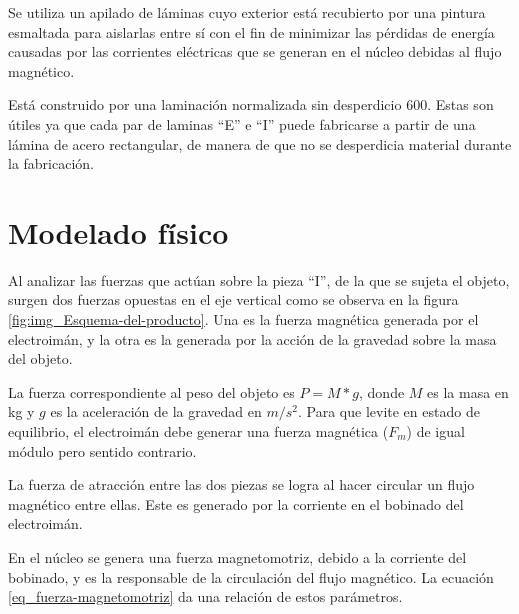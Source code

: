 \noindent Se utiliza un apilado de láminas cuyo exterior está recubierto por una pintura esmaltada para aislarlas entre sí con el fin de minimizar las pérdidas de energía causadas por las corrientes eléctricas que se generan en el núcleo debidas al flujo magnético. 

\noindent Está construido por una laminación normalizada sin desperdicio 600. Estas son útiles ya que cada par de laminas ``E'' e ``I'' puede fabricarse a partir de una lámina de acero rectangular, de manera de que no se desperdicia material durante la fabricación. 



\section{Modelado físico}

\noindent Al analizar las fuerzas que actúan sobre la pieza ``I'', de la que se sujeta el objeto, surgen dos fuerzas opuestas en el eje vertical como se observa en la figura \ref{fig:img_Esquema-del-producto}. Una es la fuerza magnética generada por el electroimán, y la otra es la generada por la acción de la gravedad sobre la masa del objeto. 
 

\noindent La fuerza correspondiente al peso del objeto es $P=M*g$, donde $M$ es la masa en kg y $g$ es la aceleración de la gravedad en $m/s^2$. Para que levite en estado de equilibrio, el electroimán debe generar una fuerza magnética ($F_{m}$) de igual módulo pero sentido contrario.

\noindent La fuerza de atracción entre las dos piezas se logra al hacer circular un flujo magnético entre ellas. Este es generado por la corriente en el bobinado del electroimán.

\noindent En el núcleo se genera una fuerza magnetomotriz, debido a la corriente del bobinado, y es la responsable de la circulación del flujo magnético. La ecuación \ref{eq_fuerza-magnetomotriz} da una relación de estos parámetros.	


